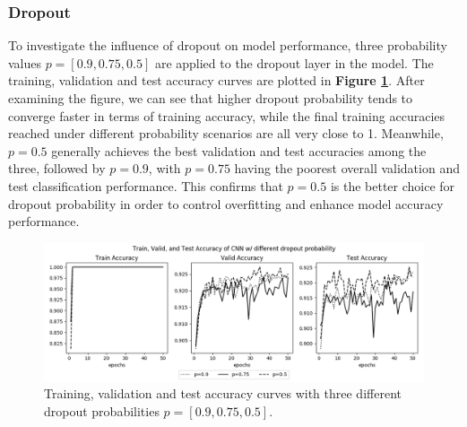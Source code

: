 \documentclass[12pt]{article}
\begin{document}
\subsubsection{Dropout}
To investigate the influence of dropout on model performance, three probability values $p=[0.9, 0.75, 0.5]$ are applied to the dropout layer in the model. The training, validation and test accuracy curves are plotted in \textbf{Figure \ref{fig:2-3-2}}. After examining the figure, we can see that higher dropout probability tends to converge faster in terms of training accuracy, while the final training accuracies reached under different probability scenarios are all very close to 1. Meanwhile, $p=0.5$ generally achieves the best validation and test accuracies among the three, followed by  $p=0.9$, with  $p=0.75$ having the poorest overall validation and test classification performance. This confirms that $p=0.5$ is the better choice for dropout probability in order to control overfitting and enhance model accuracy performance.  

\begin{figure}[!htb]
\hspace*{-2cm}
\includegraphics[width=1.2\linewidth]{images/a2/2.3-2/accuracy.png}
\caption{Training, validation and test accuracy curves with three different dropout probabilities  $p=[0.9, 0.75, 0.5]$.}\label{fig:2-3-2}
\end{figure}


\newpage
\end{document}
